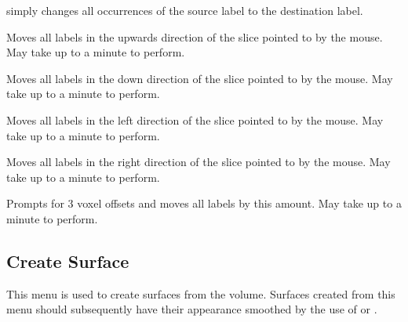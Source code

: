 \begin{description}
    simply changes all occurrences of the source label to the
    destination label.
\item[\menutwo{Segmenting}{Trans \^\ }]  Moves all labels in the
    upwards direction of the slice pointed to by the mouse.  May take
    up to a minute to perform.
\item[\menutwo{Segmenting}{Trans v}]  Moves all labels in the
    down direction of the slice pointed to by the mouse.  May take
    up to a minute to perform.
\item[\menutwo{Segmenting}{Trans $<$}]  Moves all labels in the
    left direction of the slice pointed to by the mouse.  May take
    up to a minute to perform.
\item[\menutwo{Segmenting}{Trans $>$}]  Moves all labels in the
    right direction of the slice pointed to by the mouse.  May take
    up to a minute to perform.
\item[\menutwo{Segmenting}{Big Translate}]  Prompts for 3 voxel
    offsets and moves all labels by this amount.
    May take up to a minute to perform.
\end{description}

\subsection{Create Surface}

This menu is used to create surfaces from the volume.  Surfaces created
from this menu should subsequently have their appearance smoothed by
the use of  or
.

